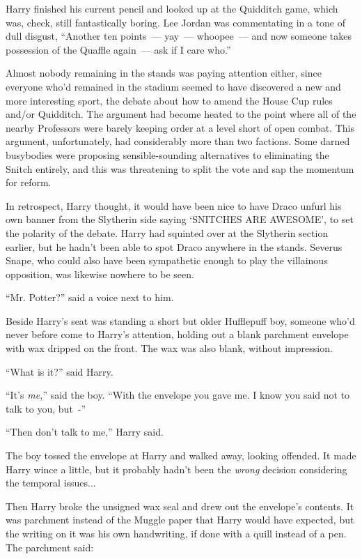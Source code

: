 Harry finished his current pencil and looked up at the Quidditch game, which was, check, still fantastically boring. Lee Jordan was commentating in a tone of dull disgust, ``Another ten points~--- yay~--- whoopee~--- and now someone takes possession of the Quaffle again~--- ask if I care who.''

Almost nobody remaining in the stands was paying attention either, since everyone who'd remained in the stadium seemed to have discovered a new and more interesting sport, the debate about how to amend the House Cup rules and/or Quidditch. The argument had become heated to the point where all of the nearby Professors were barely keeping order at a level short of open combat. This argument, unfortunately, had considerably more than two factions. Some darned busybodies were proposing sensible-sounding alternatives to eliminating the Snitch entirely, and this was threatening to split the vote and sap the momentum for reform.

In retrospect, Harry thought, it would have been nice to have Draco unfurl his own banner from the Slytherin side saying `SNITCHES ARE AWESOME', to set the polarity of the debate. Harry had squinted over at the Slytherin section earlier, but he hadn't been able to spot Draco anywhere in the stands. Severus Snape, who could also have been sympathetic enough to play the villainous opposition, was likewise nowhere to be seen.

``Mr. Potter?'' said a voice next to him.

Beside Harry's seat was standing a short but older Hufflepuff boy, someone who'd never before come to Harry's attention, holding out a blank parchment envelope with wax dripped on the front. The wax was also blank, without impression.

``What is it?'' said Harry.

``It's \emph{me,}'' said the boy. ``With the envelope you gave me. I know you said not to talk to you, but~-''

``Then don't talk to me,'' Harry said.

The boy tossed the envelope at Harry and walked away, looking offended. It made Harry wince a little, but it probably hadn't been the \emph{wrong} decision considering the temporal issues...

Then Harry broke the unsigned wax seal and drew out the envelope's contents. It was parchment instead of the Muggle paper that Harry would have expected, but the writing on it was his own handwriting, if done with a quill instead of a pen. The parchment said:


